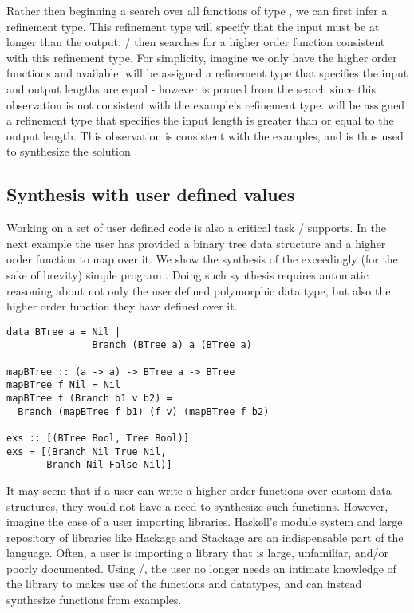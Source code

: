 Rather then beginning a search over all functions of type \codeinline{[Int] -> [Int]}, we can first infer a refinement type.
This refinement type will specify that the input must be at longer than the output.
\ourTool/ then searches for a higher order function consistent with this refinement type.
For simplicity, imagine we only have the higher order functions  and  available.
 will be assigned a refinement type that specifies the input and output lengths are equal - however is pruned from the search since this observation is not consistent with the example's refinement type.
 will be assigned a refinement type that specifies the input length is greater than or equal to the output length.
This observation is consistent with the examples, and is thus used to synthesize the solution .


\subsection{Synthesis with user defined values}

Working on a set of user defined code is also a critical task \ourTool/ supports. 
In the next example the user has provided a binary tree data structure and a higher order function to map over it. We show the synthesis of the exceedingly (for the sake of brevity) simple program .
Doing such synthesis requires automatic reasoning about not only the user defined polymorphic data type, but also the higher order function they have defined over it.

\begin{lstlisting}
data BTree a = Nil |
               Branch (BTree a) a (BTree a)

mapBTree :: (a -> a) -> BTree a -> BTree 
mapBTree f Nil = Nil
mapBTree f (Branch b1 v b2) = 
  Branch (mapBTree f b1) (f v) (mapBTree f b2)

exs :: [(BTree Bool, Tree Bool)]
exs = [(Branch Nil True Nil,
       Branch Nil False Nil)]
\end{lstlisting}

It may seem that if a user can write a higher order functions over custom data structures, they would not have a need to synthesize such functions.
However, imagine the case of a user importing libraries.
Haskell's module system and large repository of libraries like Hackage and Stackage are an indispensable part of the language\cite{hackage,stackage}.
Often, a user is importing a library that is large, unfamiliar, and/or poorly documented.
Using \ourTool/, the user no longer needs an intimate knowledge of the library to makes use of the functions and datatypes, and can instead synthesize functions from examples.



